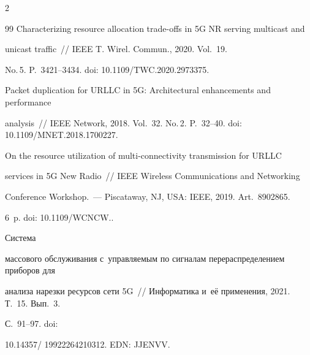 \begin{multicols}{2}
{{\begin{thebibliography}{99}
Characterizing resource allocation trade-offs in 5G NR serving multicast and 


unicast traffic~// IEEE T. Wirel. Commun., 2020. Vol.~19. 


No.\,5. P.~3421--3434. doi: 10.1109/TWC.2020.2973375.





















Packet duplication for URLLC in 5G: Architectural enhancements and performance 


analysis~// IEEE Network, 2018. Vol.~32. No.\,2. P.~32--40. doi: 10.1109/MNET.2018.1700227.









On the resource utilization of multi-connectivity transmission for URLLC 


services in 5G New Radio~// IEEE Wireless Communications and Networking 


Conference Workshop.~--- Piscataway, NJ, USA: IEEE, 2019. Art.~8902865. 


6~p. doi: 10.1109/\mbox{WCNCW}..







 Система 


массового обслуживания с~управляемым по сигналам перераспределением приборов для 


анализа нарезки ресурсов сети 5G~// Информатика и~её применения, 2021. Т.~15. Вып.~3. 


С.~91--97. doi: 


10.14357/ 19922264210312. EDN: JJENVV.








\end{thebibliography}}}
\end{multicols}
